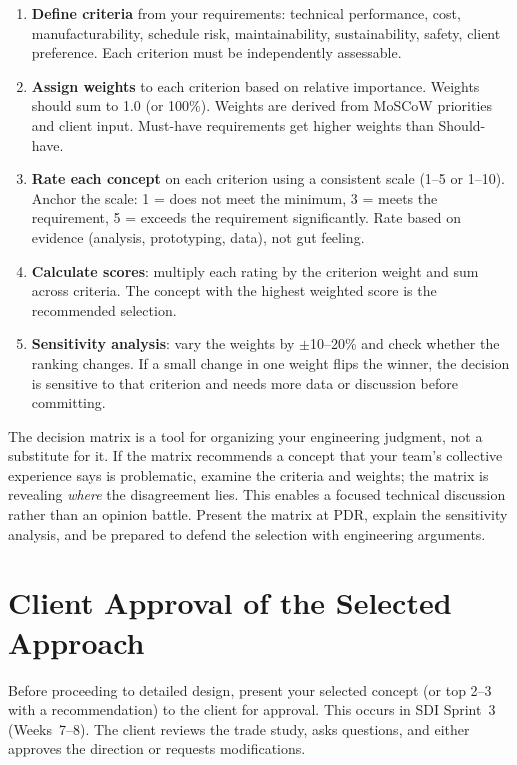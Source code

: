 \begin{enumerate}[nosep,leftmargin=1.5em]
\item \textbf{Define criteria} from your requirements: technical performance, cost, manufacturability, schedule risk, maintainability, sustainability, safety, client preference. Each criterion must be independently assessable.
\item \textbf{Assign weights} to each criterion based on relative importance. Weights should sum to 1.0 (or 100\%). Weights are derived from MoSCoW priorities and client input. Must-have requirements get higher weights than Should-have.
\item \textbf{Rate each concept} on each criterion using a consistent scale (1--5 or 1--10). Anchor the scale: 1 = does not meet the minimum, 3 = meets the requirement, 5 = exceeds the requirement significantly. Rate based on evidence (analysis, prototyping, data), not gut feeling.
\item \textbf{Calculate scores}: multiply each rating by the criterion weight and sum across criteria. The concept with the highest weighted score is the recommended selection.
\item \textbf{Sensitivity analysis}: vary the weights by $\pm$10--20\% and check whether the ranking changes. If a small change in one weight flips the winner, the decision is sensitive to that criterion and needs more data or discussion before committing.
\end{enumerate}

\begin{warningbox}
The decision matrix is a tool for organizing your engineering judgment, not a substitute for it. If the matrix recommends a concept that your team's collective experience says is problematic, examine the criteria and weights; the matrix is revealing \emph{where} the disagreement lies. This enables a focused technical discussion rather than an opinion battle. Present the matrix at PDR, explain the sensitivity analysis, and be prepared to defend the selection with engineering arguments.
\end{warningbox}

\section{Client Approval of the Selected Approach}
Before proceeding to detailed design, present your selected concept (or top 2--3 with a recommendation) to the client for approval. This occurs in SDI Sprint~3 (Weeks~7--8). The client reviews the trade study, asks questions, and either approves the direction or requests modifications.

